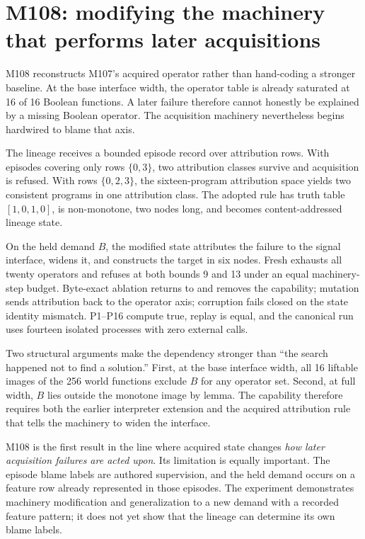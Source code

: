 \section{M108: modifying the machinery that performs later acquisitions}
\label{sec:m108}
M108 reconstructs M107's acquired operator rather than hand-coding a stronger baseline. At the base interface width, the operator table is already saturated at 16 of 16 Boolean functions. A later failure therefore cannot honestly be explained by a missing Boolean operator. The acquisition machinery nevertheless begins hardwired to blame that axis.

The lineage receives a bounded episode record over attribution rows. With episodes covering only rows $\{0,3\}$, two attribution classes survive and acquisition is refused. With rows $\{0,2,3\}$, the sixteen-program attribution space yields two consistent programs in one attribution class. The adopted rule has truth table $[1,0,1,0]$, is non-monotone, two nodes long, and becomes content-addressed lineage state.

On the held demand $B$, the modified state \mone attributes the failure to the signal interface, widens it, and constructs the target in six nodes. Fresh \mzero exhausts all twenty operators and refuses at both bounds 9 and 13 under an equal machinery-step budget. Byte-exact ablation returns to \mzero and removes the capability; mutation sends attribution back to the operator axis; corruption fails closed on the state identity mismatch. P1--P16 compute true, replay is equal, and the canonical run uses fourteen isolated processes with zero external calls.

Two structural arguments make the dependency stronger than ``the search happened not to find a solution.'' First, at the base interface width, all 16 liftable images of the 256 world functions exclude $B$ for any operator set. Second, at full width, $B$ lies outside the monotone image by lemma. The capability therefore requires both the earlier interpreter extension and the acquired attribution rule that tells the machinery to widen the interface.

M108 is the first result in the line where acquired state changes \emph{how later acquisition failures are acted upon}. Its limitation is equally important. The episode blame labels are authored supervision, and the held demand occurs on a feature row already represented in those episodes. The experiment demonstrates machinery modification and generalization to a new demand with a recorded feature pattern; it does not yet show that the lineage can determine its own blame labels.

